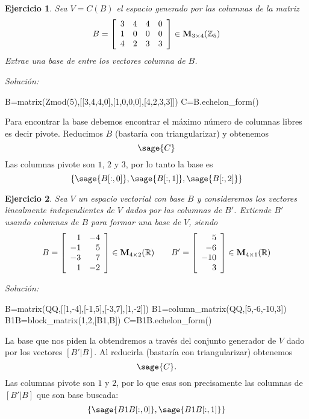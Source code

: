 \documentclass{amsart}
\newtheorem{ejer}{Ejercicio}
\begin{document}

\begin{ejer} Sea $V = C(B)$ el espacio generado por las columnas de la matriz
\[ B = \left[\begin{array}{rrrr}
3 & 4 & 4 & 0 \\
1 & 0 & 0 & 0 \\
4 & 2 & 3 & 3 
\end{array}\right] \in {\bf M}_{3 \times 4}({\mathbb Z}_{5})\] Extrae una base de entre los vectores columna de $B$.
\end{ejer}
{\it Soluci\'on:}
\begin{sageblock}
B=matrix(Zmod(5),[[3,4,4,0],[1,0,0,0],[4,2,3,3]])
C=B.echelon_form()
\end{sageblock}
Para encontrar la base debemos encontrar el máximo número de columnas libres es 
decir pivote. Reducimos $B$ (bastaría con triangularizar) y obtenemos
\[ \sage{C} \] Las columnas pivote son $1$, $2$ y $3$, por lo tanto la base es
\[ \left\lbrace \sage{B[:,0]}, \sage{B[:,1]}, \sage{B[:,2]}  \right\rbrace \] 


\begin{ejer} Sea $V$ un espacio vectorial con base $B$ y consideremos los 
vectores linealmente independientes de $V$ dados por las columnas de $B'$.
Extiende $B'$ usando columnas de $B$ para formar una base de $V$, siendo 
\[B = \left[\begin{array}{rr}
1 & -4 \\
-1 & 5 \\
-3 & 7 \\
1 & -2
\end{array}\right] \in {\bf M}_{4 \times 2}({\mathbb R}) \qquad
B' = \left[\begin{array}{r}
5 \\
-6 \\
-10 \\
3
\end{array}\right] \in {\bf M}_{4 \times 1}({\mathbb R}) \]
\end{ejer}

{\it Soluci\'on:}
\begin{sageblock}
B=matrix(QQ,[[1,-4],[-1,5],[-3,7],[1,-2]])
B1=column_matrix(QQ,[5,-6,-10,3])
B1B=block_matrix(1,2,[B1,B])
C=B1B.echelon_form()
\end{sageblock}

La base que nos piden la obtendremos a través del conjunto generador de $V$ dado 
por los vectores $[B'|B]$. Al reducirla (bastaría con triangularizar) obtenemos
\[ \sage{C}. \]  Las columnas pivote son $1$ y $2$, por lo que esas son precisamente 
las columnas de $[B'|B]$ que son base buscada:
\[ \left\lbrace \sage{B1B[:,0]}, \sage{B1B[:,1]}  \right\rbrace \] 
\end{document}
